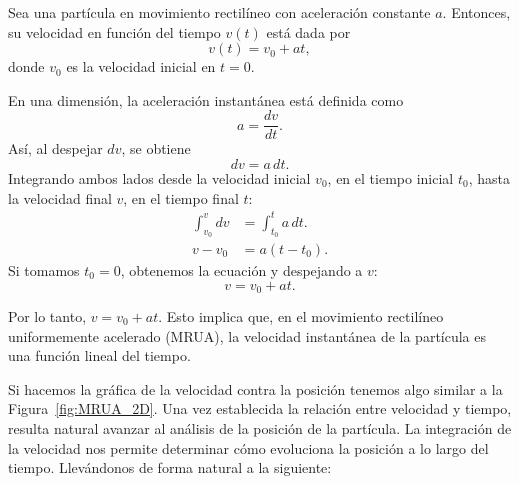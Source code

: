 \begin{proposition}{}{}
    Sea una partícula en movimiento rectilíneo con aceleración constante $a$. Entonces, su velocidad en función del tiempo $v(t)$ está dada por
    $$v(t) = v_0 + at,$$
    donde $v_0$ es la velocidad inicial en $t = 0$.
    \begin{demo}
        En una dimensión, la aceleración instantánea está definida como
        $$a = \frac{dv}{dt}.$$
        Así, al despejar $dv$, se obtiene
        $$dv = a \, dt.$$
        Integrando ambos lados desde la velocidad inicial $v_0$, en el tiempo inicial $t_0$, hasta la velocidad final $v$, en el tiempo final $t$:
        \begin{align*}
            \int_{v_0}^v dv &= \int_{t_0}^{t} a \, dt. \\
            v - v_0 &= a (t - t_0).
        \end{align*}
        Si tomamos $t_0 = 0$, obtenemos la ecuación y despejando a $v$:
        $$v = v_0 + at.$$
        
        Por lo tanto, $v = v_0 + at$. Esto implica que, en el movimiento rectilíneo uniformemente acelerado (MRUA), la velocidad instantánea de la partícula es una función lineal del tiempo.
    \end{demo}
\end{proposition}

Si hacemos la gráfica de la velocidad contra la posición tenemos algo similar a la Figura~\ref{fig:MRUA_2D}. Una vez establecida la relación entre velocidad y tiempo, resulta natural avanzar al análisis de la posición de la partícula. La integración de la velocidad nos permite determinar cómo evoluciona la posición a lo largo del tiempo. Llevándonos de forma natural a la siguiente:

